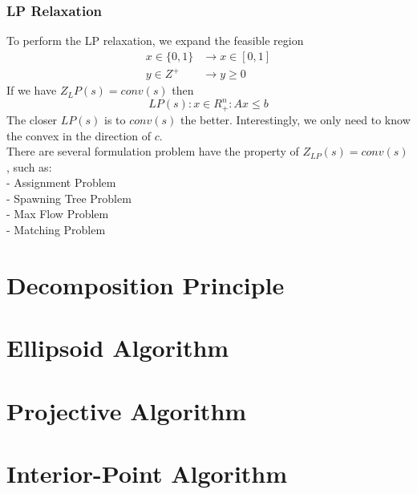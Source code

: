 			\subsection{LP Relaxation}
				To perform the LP relaxation, we expand the feasible region
				\begin{align}
					x \in \{0,1\} & \rightarrow x\in [0, 1]  \\
					y\in Z^+ & \rightarrow y \ge 0 
				\end{align}
				If we have $Z_LP(s) = conv(s)$ then
				\begin{equation} LP(s): {x\in R_+^n: Ax\le b}\end{equation}
				The closer $LP(s)$ is to $conv(s)$ the better. Interestingly, we only need to know the convex in the direction of $c$.\\
				There are several formulation problem have the property of $Z_{LP}(s) = conv(s)$, such as:\\
				\indent- Assignment Problem\\
				\indent- Spawning Tree Problem\\
				\indent- Max Flow Problem\\
				\indent- Matching Problem

	\chapter{Decomposition Principle}

	\chapter{Ellipsoid Algorithm}

	\chapter{Projective Algorithm}

	\chapter{Interior-Point Algorithm}